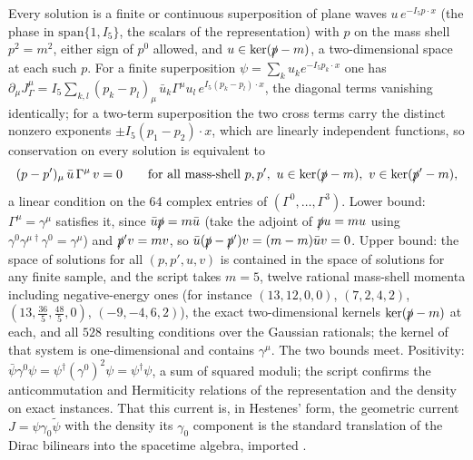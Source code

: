 Every solution is a finite or continuous superposition of plane waves $u\,e^{-I_5p\cdot x}$ (the phase in $\mathrm{span}\{1, I_5\}$, the scalars of the representation) with $p$ on the mass shell $p^{2} = m^{2}$, either sign of $p^{0}$ allowed, and $u \in \ker(\slashed{p} - m)$, a two-dimensional space at each such $p$. For a finite superposition $\psi = \sum_{k} u_{k}e^{-I_5p_{k}\cdot x}$ one has $\partial_{\mu}J^{\mu}_{\Gamma} = I_5\sum_{k,l}(p_{k} - p_{l})_{\mu}\,\bar{u}_{k}\Gamma^{\mu}u_{l}\,e^{I_5(p_{k} - p_{l})\cdot x}$, the diagonal terms vanishing identically; for a two-term superposition the two cross terms carry the distinct nonzero exponents $\pm I_5(p_{1} - p_{2})\cdot x$, which are linearly independent functions, so conservation on every solution is equivalent to
\[
(p - p')_{\mu}\,\bar{u}\,\Gamma^{\mu}\,v = 0 \qquad \text{for all mass-shell } p, p',\ u \in \ker(\slashed{p} - m),\ v \in \ker(\slashed{p}' - m),
\]
a linear condition on the $64$ complex entries of $(\Gamma^{0}, \dots, \Gamma^{3})$. Lower bound: $\Gamma^{\mu} = \gamma^{\mu}$ satisfies it, since $\bar{u}\slashed{p} = m\bar{u}$ (take the adjoint of $\slashed{p}u = mu$ using $\gamma^{0}\gamma^{\mu\dagger}\gamma^{0} = \gamma^{\mu}$) and $\slashed{p}'v = mv$, so $\bar{u}(\slashed{p} - \slashed{p}')v = (m - m)\bar{u}v = 0$. Upper bound: the space of solutions for all $(p, p', u, v)$ is contained in the space of solutions for any finite sample, and the script takes $m = 5$, twelve rational mass-shell momenta including negative-energy ones (for instance $(13, 12, 0, 0)$, $(7, 2, 4, 2)$, $(13, \tfrac{36}{5}, \tfrac{48}{5}, 0)$, $(-9, -4, 6, 2)$), the exact two-dimensional kernels $\ker(\slashed{p} - m)$ at each, and all $528$ resulting conditions over the Gaussian rationals; the kernel of that system is one-dimensional and contains $\gamma^{\mu}$. The two bounds meet. Positivity: $\bar{\psi}\gamma^{0}\psi = \psi^{\dagger}(\gamma^{0})^{2}\psi = \psi^{\dagger}\psi$, a sum of squared moduli; the script confirms the anticommutation and Hermiticity relations of the representation and the density on exact instances. That this current is, in Hestenes' form, the geometric current $J = \psi\gamma_{0}\tilde{\psi}$ with the density its $\gamma_{0}$ component is the standard translation of the Dirac bilinears into the spacetime algebra, imported \cite{Hestenes1975}.
